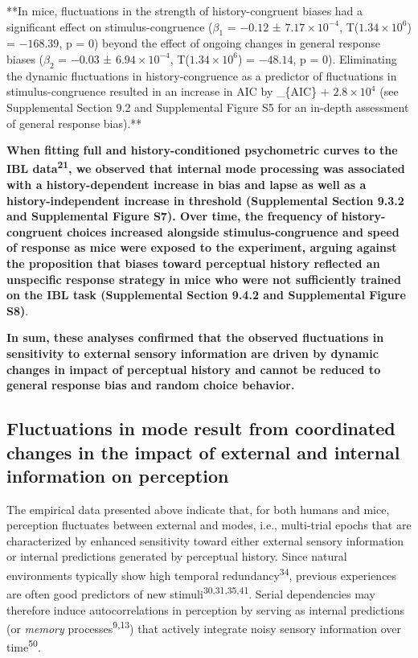 \documentclass[
]{article}
\begin{document}
**In mice, fluctuations in the strength of history-congruent biases had
a significant effect on stimulus-congruence (\(\beta_1\) = \(-0.12\) ±
\(\ensuremath{7.17\times 10^{-4}}\),
T(\(\ensuremath{1.34\times 10^{6}}\)) = \(-168.39\), p = \(0\)) beyond
the effect of ongoing changes in general response biases (\(\beta_2\) =
\(-0.03\) ± \(\ensuremath{6.94\times 10^{-4}}\),
T(\(\ensuremath{1.34\times 10^{6}}\)) = \(-48.14\), p = \(0\)).
Eliminating the dynamic fluctuations in history-congruence as a
predictor of fluctuations in stimulus-congruence resulted in an increase
in AIC by \delta\_\{AIC\} + \(\ensuremath{2.8\times 10^{4}}\) (see
Supplemental Section 9.2 and Supplemental Figure S5 for an in-depth
assessment of general response bias).**

\textbf{When fitting full and history-conditioned psychometric curves to
the IBL data\textsuperscript{21}, we observed that internal mode
processing was associated with a history-dependent increase in bias and
lapse as well as a history-independent increase in threshold
(Supplemental Section 9.3.2 and Supplemental Figure S7). Over time, the
frequency of history-congruent choices increased alongside
stimulus-congruence and speed of response as mice were exposed to the
experiment, arguing against the proposition that biases toward
perceptual history reflected an unspecific response strategy in mice who
were not sufficiently trained on the IBL task (Supplemental Section
9.4.2 and Supplemental Figure S8)}.

\textbf{In sum, these analyses confirmed that the observed fluctuations
in sensitivity to external sensory information are driven by dynamic
changes in impact of perceptual history and cannot be reduced to general
response bias and random choice behavior.}

\hypertarget{fluctuations-in-mode-result-from-coordinated-changes-in-the-impact-of-external-and-internal-information-on-perception}{%
\subsection{Fluctuations in mode result from coordinated changes in the
impact of external and internal information on
perception}\label{fluctuations-in-mode-result-from-coordinated-changes-in-the-impact-of-external-and-internal-information-on-perception}}

The empirical data presented above indicate that, for both humans and
mice, perception fluctuates between external and modes, i.e.,
multi-trial epochs that are characterized by enhanced sensitivity toward
either external sensory information or internal predictions generated by
perceptual history. Since natural environments typically show high
temporal redundancy\textsuperscript{34}, previous experiences are often
good predictors of new stimuli\textsuperscript{30,31,35,41}. Serial
dependencies may therefore induce autocorrelations in perception by
serving as internal predictions (or \emph{memory}
processes\textsuperscript{9,13}) that actively integrate noisy sensory
information over time\textsuperscript{50}.
\end{document}
